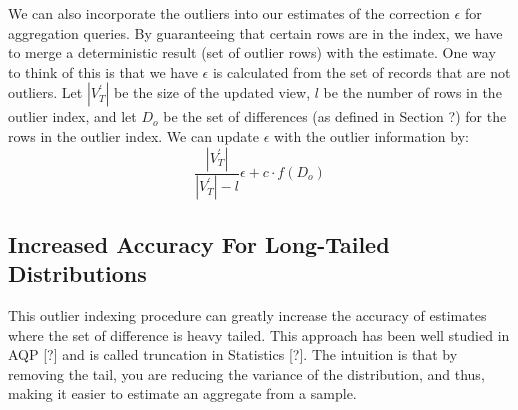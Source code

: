 We can also incorporate the outliers into our estimates of the correction
$\epsilon$ for aggregation queries. By guaranteeing that certain rows are in the index, we
have to merge a deterministic result (set of outlier rows) with the
estimate. One way to think of this is that we have $\epsilon$ is
calculated from the set of records that are not outliers. Let $|V_{T}^{'}|$
be the size of the updated view, $l$ be the number of rows in the
outlier index, and let $D_{o}$ be the set of differences (as defined
in Section ?) for the rows in the outlier index. We can update $\epsilon$
with the outlier information by:
\[
\frac{|V_{T}^{'}|}{|V_{T}^{'}|-l}\epsilon+c\cdot f(D_{o})
\]


\subsection{Increased Accuracy For Long-Tailed Distributions}
This outlier indexing procedure can greatly increase the accuracy
of estimates where the set of difference is heavy tailed. This approach
has been well studied in AQP {[}?{]} and is called truncation in Statistics
{[}?{]}. The intuition is that by removing the tail, you are reducing
the variance of the distribution, and thus, making it easier to estimate
an aggregate from a sample.